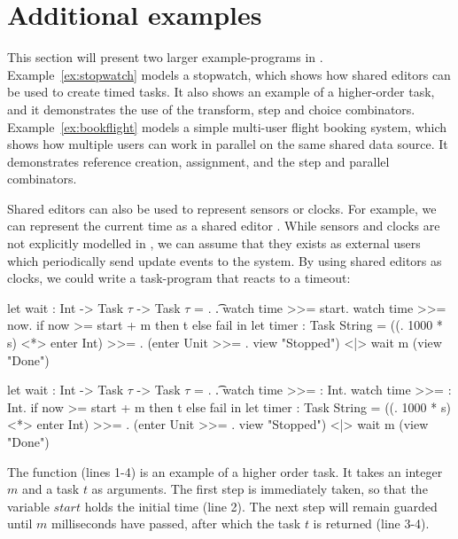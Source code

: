 \section{Additional examples}

This section will present two larger example-programs in \TOPHAT.
Example~\ref{ex:stopwatch} models a stopwatch, which shows how shared editors can be used to create timed tasks.
It also shows an example of a higher-order task, and it demonstrates the use of the transform, step and choice combinators.
Example~\ref{ex:bookflight} models a simple multi-user flight booking system, which shows how multiple users can work in parallel on the same shared data source.
It demonstrates reference creation, assignment, and the step and parallel combinators.

  Shared editors can also be used to represent sensors or clocks.
  For example, we can represent the current time as a shared editor .
  While sensors and clocks are not explicitly modelled in \TOPHAT, we can assume that they exists as external users which periodically send update events to the system.
  By using shared editors as clocks, we could write a task-program that reacts to a timeout:
  \begin{TASK}[numbers=right,moreemph={age,now}]
    let wait : Int -> Task $\tau$ -> Task $\tau$ = \m. \t.
      watch time >>= start.
      watch time >>= now.
        if now >= start + m then t else fail  in
    let timer : Task String = ((\s. 1000 * s) <*> enter Int) >>= \m.
      (enter Unit >>= \x. view "Stopped") <|> wait m (view "Done")
  \end{TASK}
  \begin{TASK}[numbers=right]
    let wait : Int -> Task $\tau$ -> Task $\tau$ = \m. \t.
      watch time >>= \start : Int.
      watch time >>= \now : Int.
        if now >= start + m then t else fail  in
    let timer : Task String = ((\s. 1000 * s) <*> enter Int) >>= \m.
      (enter Unit >>= \x. view "Stopped") <|> wait m (view "Done")
  \end{TASK}
  The  function (lines 1-4) is an example of a higher order task.
  It takes an integer $m$ and a task $t$ as arguments.
  The first step is immediately taken, so that the variable $\mathit{start}$ holds the initial time (line 2).
  The next step will remain guarded until $m$ milliseconds have passed, after which the task $t$ is returned (line 3-4).

